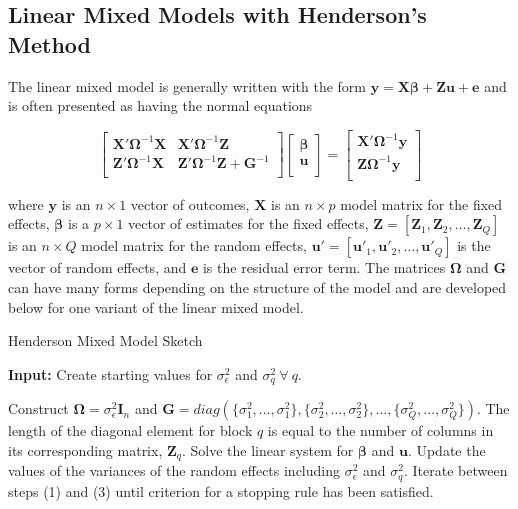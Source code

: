\documentclass[12pt]{article}
\begin{document}
\subsection*{Linear Mixed Models with Henderson's Method}

The linear mixed model is generally written with the form $\bm{y} = \bm{X}\bm{\beta} + \bm{Z}\bm{u} + \bm{e}$ \cite{laird:ware} and is often presented as having the normal equations \cite{henderson}

\begin{equation}
\label{eqn:henderson:eiv}
\left [ 
\begin{array}{cc}
\bm{X'}\bm{\Omega}^{-1}\bm{X} & \bm{X'}\bm{\Omega}^{-1}\bm{Z}\\
\bm{Z}'\bm{\Omega}^{-1}\bm{X} & \bm{Z}'\bm{\Omega}^{-1}\bm{Z} + \bm{G}^{-1}\\
\end{array}
\right ]
\left [ 
\begin{array}{c}
\bm{\beta}\\
\bm{u}\\
\end{array}
\right ] = 
\left [ 
\begin{array}{c}
\bm{X'}\bm{\Omega}^{-1}\bm{y} \\
\bm{Z}\bm{\Omega}^{-1}\bm{y}\\
\end{array}
\right] 
\end{equation}


\noindent where $\bm{y}$ is an $n \times 1$ vector of outcomes, $\bm{X}$ is an $n \times p$ model matrix for the fixed effects, $\bm{\beta}$ is a $p \times 1$ vector of estimates for the fixed effects, $\bm{Z} = [\bm{Z}_1, \bm{Z}_2, \ldots, \bm{Z}_Q]$ is an $n \times Q$ model matrix for the random effects, $\bm{u}' = [\bm{u}'_1, \bm{u}'_2, \ldots, \bm{u}'_Q]$ is the vector of random effects, and $\bm{e}$ is the residual error term. The matrices $\bm{\Omega}$ and $\bm{G}$ can have many forms depending on the structure of the model and are developed below for one variant of the linear mixed model. 

\begin{algorithm}
\caption{Henderson Mixed Model Sketch}
\label{algo:a}
	\hspace*{\algorithmicindent} \textbf{Input:} Create starting values for $\sigma^2_{\epsilon}$ and $\sigma^2_{q} \ \forall \ q$.
\begin{algorithmic}[1]
	\State Construct $\bm{\Omega} = \sigma^2_{\epsilon}\bm{I}_n$ and $\bm{G}=diag(\{\sigma^2_{1}, \ldots, \sigma^2_{1}\}, \{\sigma^2_{2}, \ldots, \sigma^2_{2}\}, \ldots, \{\sigma^2_{Q}, \ldots, \sigma^2_{Q}\} )$. The length of the diagonal element for block $q$ is equal to the number of columns in its corresponding matrix, $\bm{Z}_q$.
	\State Solve the linear system for $\bm{\beta}$ and $\bm{u}$.
	\State Update the values of the variances of the random effects including $\sigma^2_{\epsilon}$ and $\sigma^2_{q}$.
	\State Iterate between steps (1) and (3) until criterion for a stopping rule has been satisfied. 
\end{algorithmic}
\end{algorithm}
\end{document}
